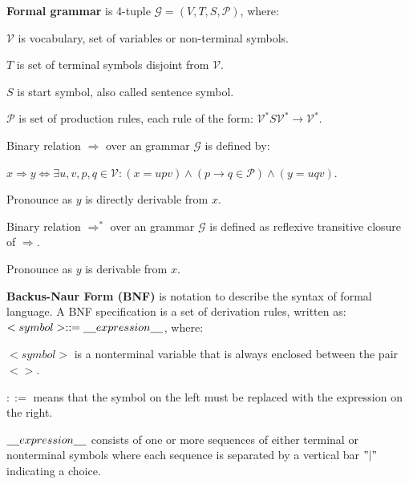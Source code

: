 \documentclass[a4paper,10pt]{article}
\begin{document}
\begin{terms}
\newpage

    \item \textbf{Formal grammar} is 4-tuple $\mathcal{G} = (V, T, S, \mathcal{P})$, where:

    \begin{terms}
        \item $\mathcal{V}$ is vocabulary, set of variables or non-terminal symbols.

        \item $T$ is set of terminal symbols disjoint from $\mathcal{V}$.

        \item $S$ is start symbol, also called sentence symbol.

        \item $\mathcal{P}$ is set of production rules, each rule of the form:
        $\mathcal{V}^*S\mathcal{V}^* \xrightarrow{} \mathcal{V}^*$.
    \end{terms}

    \item Binary relation $\mathbf{\Rightarrow}$ over an grammar $\mathcal{G}$ is defined by:

    $x \Rightarrow y \Longleftrightarrow \exists u,v,p,q \in \mathcal{V}: (x = upv) \land (p \rightarrow{} q \in \mathcal{P}) \land (y = uqv)$.

    Pronounce as $y$ is directly derivable from $x$.

    \item Binary relation $\mathbf{\Rightarrow^*}$ over an grammar $\mathcal{G}$ is defined as reflexive transitive closure of $\Rightarrow$.

    Pronounce as $y$ is derivable from $x$.

    \item \textbf{Backus-Naur Form (BNF)} is notation to describe the syntax of formal language. A BNF specification is a set of derivation rules, written as:
    $<symbol> ::= \underline{\hspace{4mm}}{}expression\underline{\hspace{4mm}}$, where:

    \begin{terms}
        \item $<symbol>$ is a nonterminal variable that is always enclosed between the pair $<>$.

        \item $::=$ means that the symbol on the left must be replaced with the expression on the right.

        \item $\underline{\hspace{4mm}}{}expression\underline{\hspace{4mm}}$  consists of one or more sequences of either terminal or nonterminal symbols where each sequence is separated by a vertical bar $"|"$ indicating a choice.
    \end{terms}



\end{terms}
\end{document}
